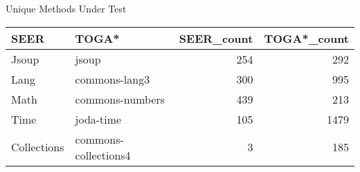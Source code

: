 \begin{table*****}
\centering
\caption{Unique Methods Under Test}
\label{tab:common_unique_MUT}
\begin{tabular}{llrr}
\toprule
        SEER &                 TOGA* &  SEER\_count &  TOGA*\_count \\
\midrule
       Jsoup &                 jsoup &         254 &          292 \\
        Lang &         commons-lang3 &         300 &          995 \\
        Math &       commons-numbers &         439 &          213 \\
        Time &             joda-time &         105 &         1479 \\
 Collections &  commons-collections4 &           3 &          185 \\
\bottomrule
\end{tabular}
\end{table*****}
